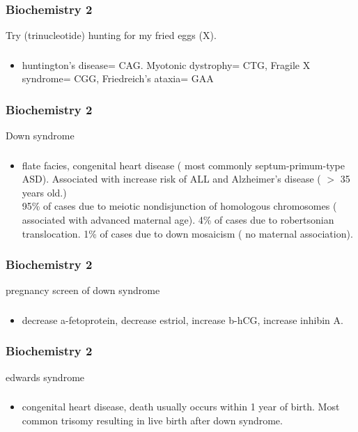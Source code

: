 \documentclass[11pt]{beamer}
\begin{document}
\begin{frame}
 \frametitle{Biochemistry 2}
Try (trinucleotide) hunting for my fried eggs (X).
\end{frame}

\begin{frame}
 \frametitle{}
\begin{itemize}
\item huntington's disease= CAG. Myotonic dystrophy= CTG, Fragile X syndrome= CGG, Friedreich's ataxia= GAA 
\end{itemize}
\end{frame}

\begin{frame}
 \frametitle{Biochemistry 2}
Down syndrome 
\end{frame}

\begin{frame}
 \frametitle{}
\begin{itemize}
\item flate facies, congenital heart disease ( most commonly septum-primum-type ASD). Associated with increase risk of ALL and Alzheimer's disease ( $>$ 35 years old.)  \\ 95\% of cases due to meiotic nondisjunction of homologous chromosomes ( associated with advanced maternal age). 4\% of cases due to robertsonian translocation. 1\% of cases due to down mosaicism ( no maternal association). 
\end{itemize}
\end{frame}

\begin{frame}
 \frametitle{Biochemistry 2}
pregnancy screen of down syndrome
\end{frame}

\begin{frame}
 \frametitle{}
\begin{itemize}
\item decrease a-fetoprotein, decrease estriol, increase b-hCG, increase inhibin A. 
\end{itemize}
\end{frame}

\begin{frame}
 \frametitle{Biochemistry 2}
edwards syndrome
\end{frame}

\begin{frame}
 \frametitle{}
\begin{itemize}
\item congenital heart disease, death usually occurs within 1 year of birth. Most common trisomy resulting in live birth after down syndrome. 
\end{itemize}
\end{frame}
\end{document}
